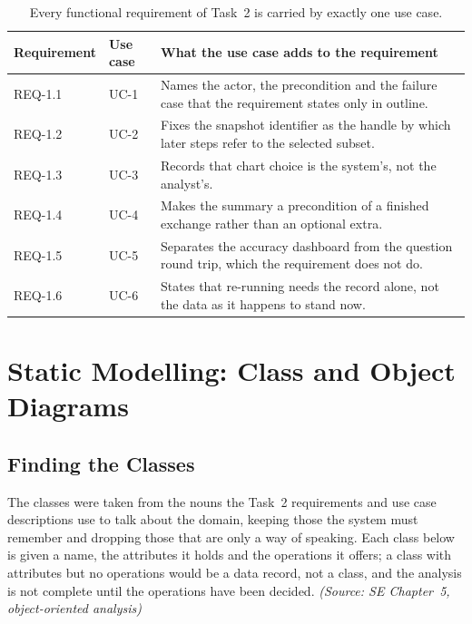 \documentclass[12pt,a4paper]{report}
\newcommand{\src}[1]{{\small\itshape (Source: #1)}}
\begin{document}
\begin{table}[H]
  \centering
  \caption{Every functional requirement of Task~2 is carried by exactly one
    use case.}
  \label{tab:uc-trace}
  \setlength{\tabcolsep}{4.5pt}
  \begin{tabular}{@{}l l >{\raggedright\arraybackslash}p{9.0cm}@{}}
    \toprule[1.5pt]
    \textbf{Requirement} & \textbf{Use case} & \textbf{What the use case
      adds to the requirement} \\
    \midrule
    REQ-1.1 & UC-1 & Names the actor, the precondition and the failure
      case that the requirement states only in outline. \\
    \addlinespace
    REQ-1.2 & UC-2 & Fixes the snapshot identifier as the handle by which
      later steps refer to the selected subset. \\
    \addlinespace
    REQ-1.3 & UC-3 & Records that chart choice is the system's, not the
      analyst's. \\
    \addlinespace
    REQ-1.4 & UC-4 & Makes the summary a precondition of a finished
      exchange rather than an optional extra. \\
    \addlinespace
    REQ-1.5 & UC-5 & Separates the accuracy dashboard from the question
      round trip, which the requirement does not do. \\
    \addlinespace
    REQ-1.6 & UC-6 & States that re-running needs the record alone, not the
      data as it happens to stand now. \\
    \bottomrule[1.5pt]
  \end{tabular}
\end{table}

\chapter{Static Modelling: Class and Object Diagrams}
\label{ch:static}

\section{Finding the Classes}
\label{sec:finding-classes}

The classes were taken from the nouns the Task~2 requirements and use case
descriptions use to talk about the domain, keeping those the system must
remember and dropping those that are only a way of speaking. Each class
below is given a name, the attributes it holds and the operations it
offers; a class with attributes but no operations would be a data record,
not a class, and the analysis is not complete until the operations have
been decided. \src{SE Chapter~5, object-oriented analysis}
\end{document}
